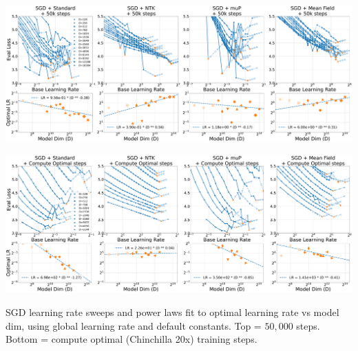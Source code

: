\clearpage
\thispagestyle{plain}
\begin{SidewaysFigure}
\\
\includegraphics[width=0.98\linewidth]{icml2024/figures/lr_sweeps/compute_opt_appendix/sgd+50k_steps.pdf}

\figvspace

\includegraphics[width=0.98\linewidth]{icml2024/figures/lr_sweeps/compute_opt_appendix/sgd+compute_opt.pdf}
\caption{SGD learning rate sweeps and power laws fit to optimal learning rate vs model dim, using global learning rate and default constants. Top = $50{,}000$ steps. Bottom = compute optimal (Chinchilla 20x) training steps.}
\label{fig:app_compute_opt_sgd}
\end{SidewaysFigure}
\clearpage

